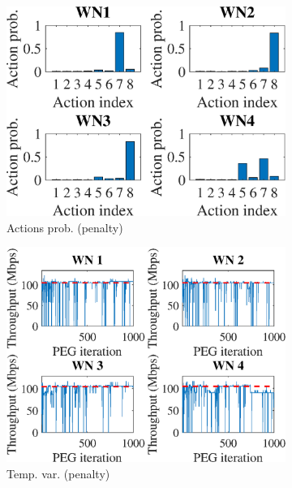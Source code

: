 \documentclass[preprint,12pt]{article}
\begin{document}
\begin{figure}[h!]
	\centering
	\begin{subfigure}[b]{.3\textwidth}
		\includegraphics[width=\textwidth]{images/actions_probability_PEG}
		\caption{Actions prob. (penalty)}\label{fig:actions_probability_PEG}
	\end{subfigure}	
	\begin{subfigure}[b]{.3\textwidth}
		\includegraphics[width=\textwidth]{images/temporal_individual_tpt_PEG}
		\caption{Temp. var.  (penalty)}\label{fig:temporal_individual_tpt_PEG}
	\end{subfigure}
	\begin{subfigure}[b]{.3\textwidth}

\end{subfigure}
\end{figure}
\end{document}
